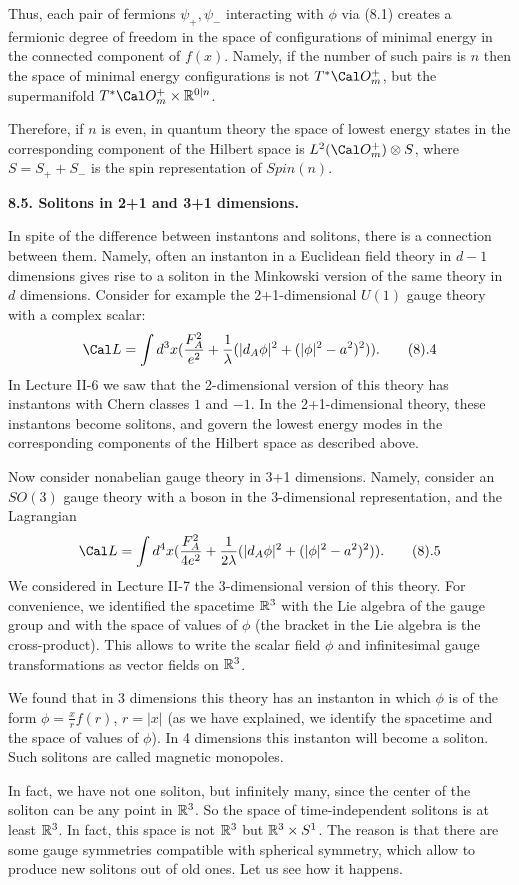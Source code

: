 Thus, each pair of fermions $\psi_+,\psi_-$ interacting with $\phi$ via
(8.1) creates a fermionic degree of freedom in the space of configurations
of minimal energy in the connected component of $f(x)$. Namely, if the number
of such pairs is $n$ then the space of minimal energy configurations is 
not $T^*\O_m^+$, but the supermanifold $T^*\O_m^+\times \R^{0|n}$. 

Therefore, if $n$ is even, in quantum theory the space of 
lowest energy states in the corresponding component of the Hilbert space 
is $L^2(\O_m^+)\o S$, where $S=S_++S_-$ is the spin representation of
$Spin(n)$. 

{\bf 8.5. Solitons in 2+1 and 3+1 dimensions.}

In spite of the difference between instantons and solitons, 
there is a connection between them.  
Namely, often an instanton in a Euclidean field theory in $d-1$ dimensions
gives rise to a soliton in the Minkowski version of the same theory in $d$ 
dimensions. Consider for example the 2+1-dimensional $U(1)$ gauge theory 
with a complex scalar:
$$
\Cal L=\int d^3x(\frac{F_A^2}{e^2}+\frac{1}{\l}(|d_A\phi|^2+(|\phi|^2-a^2)^2)).
\tag 8.4
$$
In Lecture II-6 we saw that the 2-dimensional version of this theory 
has instantons with Chern classes $1$ and $-1$. 
In the 2+1-dimensional theory, these instantons become solitons, and 
govern the lowest energy modes in the corresponding components 
of the Hilbert space as described above. 

Now consider nonabelian gauge theory in 3+1 dimensions. 
Namely, consider an $SO(3)$ gauge theory with a boson in the 3-dimensional 
representation, and the Lagrangian 
$$
\Cal L=\int d^4x(\frac{F_A^2}{4e^2}+
\frac{1}{2\l}(|d_A\phi|^2+(|\phi|^2-a^2)^2)).
\tag 8.5
$$   
We considered in Lecture II-7 the 3-dimensional version of this theory.
For convenience, we identified the spacetime $\Bbb R^3$ 
with the Lie algebra of the gauge group and with the space of values of 
$\phi$ (the bracket in the Lie algebra is the cross-product). 
This allows to write the scalar field $\phi$ and infinitesimal gauge
transformations as vector fields on $\Bbb R^3$.

We found that in 3 dimensions this theory   
has an instanton in which $\phi$ is
of the form $\phi=\frac{x}{r}f(r)$, $r=|x|$ (as we have explained, 
we identify the spacetime and the space of values of $\phi$). 
In 4 dimensions this instanton will become a soliton. 
Such solitons are called magnetic monopoles. 

In fact, we have not one soliton, 
but infinitely many, since the center of the soliton can be any point in 
$\Bbb R^3$. So the space of time-independent solitons is at least $\Bbb R^3$. 
In fact, this space is not $\Bbb R^3$ but $\Bbb R^3\times S^1$. 
The reason is that there are some gauge symmetries compatible with 
spherical symmetry, which allow to produce new solitons out of old ones. 
Let us see how it happens. 

